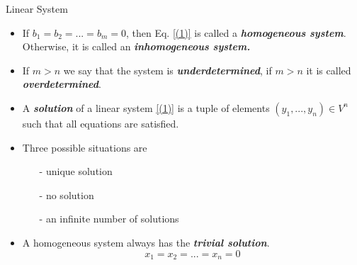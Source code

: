 \documentclass[hyperref={pdfpagelabels=true}]{beamer}
\newcommand{\highlightg}[1]{\textcolor[rgb]{0.1,0.5,0.3}{\emph{\textbf{#1}}}}
\newcommand{\<}{\langle}
\renewcommand{\>}{\rangle}
\begin{document}
\begin{frame}{Linear System}
    \begin{block}{}
        \begin{itemize}
            \item If $b_{1} = b_{2} = ... = b_{m} = 0$, then Eq. \ref{(1)} is called a \highlightg{homogeneous system}. Otherwise, it is called an \highlightg{inhomogeneous system.}
            \item If $m > n$ we say that the system is \highlightg{underdetermined}, if $m > n$ it is called \highlightg{overdetermined}.
            \item A \highlightg{solution} of a linear system \ref{(1)} is a tuple of elements $(y_1,...,y_n) \in V^{n}$ such that all equations are satisfied.
            \item Three possible situations are
                \begin{itemize}
                \item[-] unique solution
                \item[-] no solution
                \item[-] an infinite number of solutions
                \end{itemize}  
            \item A homogeneous system always has the \highlightg{trivial solution}.
            \[x_1 = x_2 = ... = x_n = 0\]
        \end{itemize}
    \end{block}
\end{frame}
\end{document}
